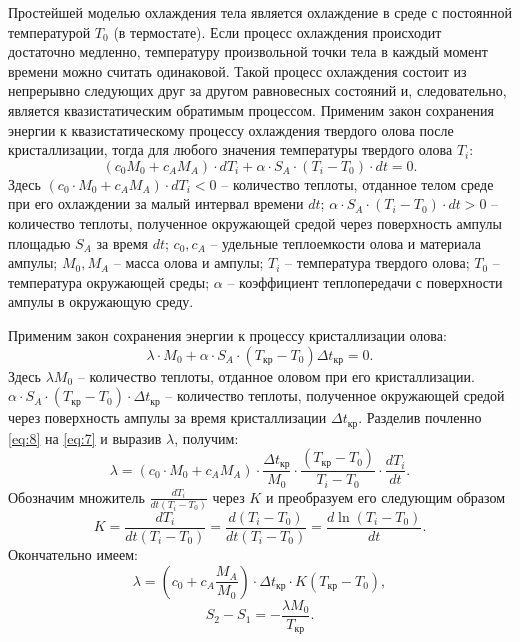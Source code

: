 \documentclass[a4paper]{article}
\begin{document}
Простейшей моделью охлаждения тела является охлаждение в среде с постоянной температурой $T_0$ (в термостате). Если процесс охлаждения происходит достаточно медленно, температуру произвольной точки тела в каждый момент времени можно считать одинаковой. Такой процесс охлаждения состоит из непрерывно следующих друг за другом равновесных состояний и, следовательно, является квазистатическим обратимым процессом. Применим закон сохранения энергии к квазистатическому процессу охлаждения твердого олова после кристаллизации, тогда для любого значения температуры твердого олова $T_i$:
\begin{equation} \label{eq:7}
(c_0 M_0 + c_A M_A) \cdot dT_i + \alpha \cdot S_A \cdot (T_i - T_0) \cdot dt = 0.
\end{equation}
Здесь $(c_0 \cdot M_0 + c_A M_A) \cdot dT_i < 0$ – количество теплоты, отданное телом среде при его охлаждении за малый интервал времени $dt$; $\alpha \cdot S_A \cdot (T_i - T_0) \cdot dt > 0$ – количество теплоты, полученное окружающей средой через поверхность ампулы площадью $S_A$ за время $dt$; $c_0, c_A$ – удельные теплоемкости олова и материала ампулы; $M_0, M_A$ – масса олова и ампулы; $T_i$ – температура твердого олова; $T_0$ – температура окружающей среды; $\alpha$ – коэффициент теплопередачи с поверхности ампулы в окружающую среду.

Применим закон сохранения энергии к процессу кристаллизации олова:
\begin{equation} \label{eq:8}
\lambda \cdot M_0 + \alpha \cdot S_A \cdot (T_{\text{кр}} - T_0) \Delta t_{\text{кр}} = 0.
\end{equation}
Здесь $\lambda M_0$ – количество теплоты, отданное оловом при его кристаллизации. $\alpha \cdot S_A \cdot (T_{\text{кр}} - T_0) \cdot \Delta t_{\text{кр}}$ – количество теплоты, полученное окружающей средой через поверхность ампулы за время кристаллизации $\Delta t_{\text{кр}}$. Разделив почленно \eqref{eq:8} на \eqref{eq:7} и выразив $\lambda$, получим:
\begin{equation} \label{eq:9}
\lambda = (c_0 \cdot M_0 + c_A M_A) \cdot \frac{\Delta t_{\text{кр}}}{M_0} \cdot \frac{(T_{\text{кр}} - T_0)}{T_i - T_0} \cdot \frac{dT_i}{dt}.
\end{equation}
Обозначим множитель $\frac{dT_i}{dt(T_i - T_0)}$ через $K$ и преобразуем его следующим образом
\begin{equation} \label{eq:10}
K = \frac{dT_i}{dt(T_i - T_0)} = \frac{d(T_i - T_0)}{dt(T_i - T_0)} = \frac{d \ln(T_i - T_0)}{dt}.
\end{equation}
Окончательно имеем:
\begin{equation} \label{eq:11}
\lambda = \left(c_0 + c_A \frac{M_A}{M_0}\right) \cdot \Delta t_{\text{кр}} \cdot K(T_{\text{кр}} - T_0),
\end{equation}
\begin{equation} \label{eq:12}
S_2 - S_1 = -\frac{\lambda M_0}{T_{\text{кр}}}.
\end{equation}
\end{document}
